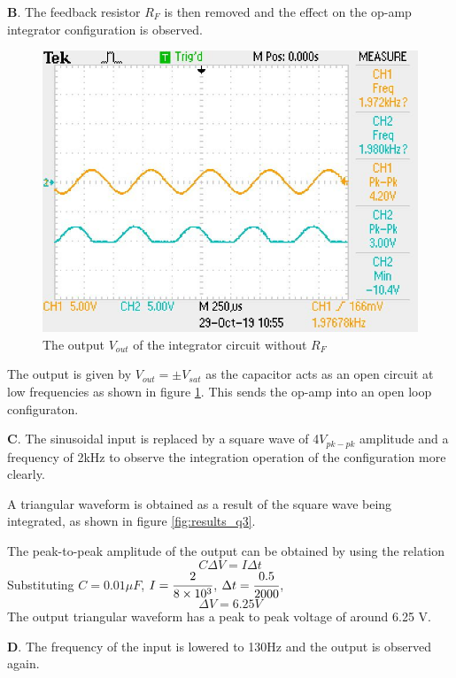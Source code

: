 \documentclass[12pt, titlepage]{article}
\theoremstyle{definition}
\begin{document}
    \newpage
    \textbf{B}. The feedback resistor $R_F$ is then removed and the effect on the op-amp integrator configuration is observed.

    \begin{figure}[h]
      \centering
      \includegraphics[scale=0.5]{images/results_q2.jpeg}
      \caption{The output \color{cyan}$V_{out}$ \color{black}of the integrator circuit without $R_F$}
      \label{fig:results_q2}
    \end{figure}

    The output is given by $V_{out}=\pm V_{sat}$ as the capacitor acts as an open circuit at low frequencies as shown in figure \ref{fig:results_q2}. This sends the op-amp into an open loop configuraton.

    \textbf{C}. The sinusoidal input is replaced by a square wave of 4$V_{pk-pk}$ amplitude and a frequency of 2kHz to observe the integration operation of the configuration more clearly.

    A triangular waveform is obtained as a result of the square wave being integrated, as shown in figure \ref{fig:results_q3}.

    The peak-to-peak amplitude of the output can be obtained by using the relation
    $$ C\Delta V = I\Delta t$$
    Substituting $C=0.01\mu F$, $I=\cfrac{2}{8\times 10^3}$, $\Delta t = \cfrac{0.5}{2000}$,
    $$ \Delta V = 6.25 V$$
    The output triangular waveform has a peak to peak voltage of around 6.25 V.

    \textbf{D}. The frequency of the input is lowered to 130Hz and the output is observed again.
\end{document}
